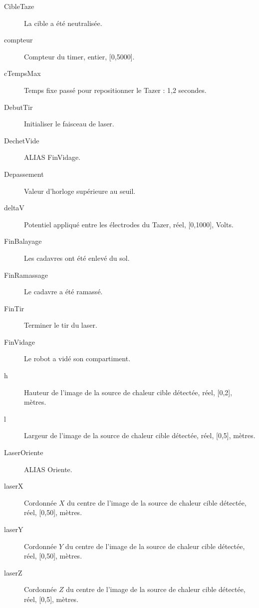\begin{description}
	\item [CibleTaze]\el
	La cible a été neutralisée.

	\item [compteur]\el
	Compteur du timer, entier, [0,5000].

	\item [cTempsMax]\el
	Temps fixe passé pour repositionner le Tazer : 1,2 secondes.

	\item [DebutTir]\el
	Initialiser le faisceau de laser.

	\item [DechetVide]\el
	ALIAS FinVidage.

	\item [Depassement]\el
	Valeur d'horloge supérieure au seuil.

	\item [deltaV]\el
	Potentiel appliqué entre les électrodes du Tazer, réel, [0,1000], Volts.

	\item [FinBalayage]\el
	Les cadavres ont été enlevé du sol.

	\item [FinRamassage]\el
	Le cadavre a été ramassé.

	\item [FinTir]\el
	Terminer le tir du laser.

	\item [FinVidage]\el
	Le robot a vidé son compartiment.

	\item [h]\el
	Hauteur de l'image de la source de chaleur cible détectée, réel, [0,2], mètres.

	\item [l]\el
	Largeur de l'image de la source de chaleur cible détectée, réel, [0,5], mètres.

	\item [LaserOriente]\el
	ALIAS Oriente.

	\item [laserX]\el
	Cordonnée $X$ du centre de l'image de la source de chaleur cible détectée, réel, [0,50], mètres.

	\item [laserY]\el
	Cordonnée $Y$ du centre de l'image de la source de chaleur cible détectée, réel, [0,50], mètres.

	\item [laserZ]\el
	Cordonnée $Z$ du centre de l'image de la source de chaleur cible détectée, réel, [0,5], mètres.


\end{description}
